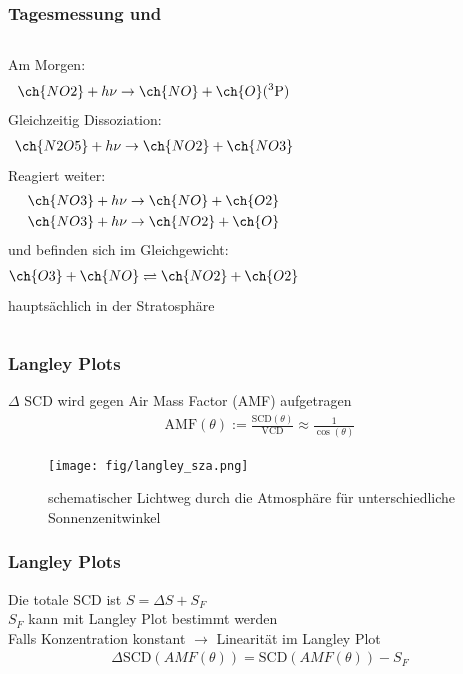 \documentclass{beamer}
\begin{document}
\begin{frame}
    \frametitle{Tagesmessung  und }
    \begin{columns}
    	Am Morgen:
    	\begin{align}
    		\ch{NO2} + h \nu \to \ch{NO} + \ch{O}(^3\text{P})
    	\end{align}
    \pause
    	Gleichzeitig Dissoziation:
    	\begin{align}
    		\ch{N2O5} + h \nu \to \ch{NO2} + \ch{NO3}
    	\end{align}
    \pause
    	Reagiert weiter:
    	\begin{align}
    		\ch{NO3} + h \nu \to \ch{NO} + \ch{O2}\\
    		\ch{NO3} + h \nu \to \ch{NO2} + \ch{O}
    	\end{align}
    \pause	
      	 und  befinden sich im Gleichgewicht:
      		\begin{align}
      			\ch{O3} + \ch{NO} \rightleftharpoons \ch{NO2} + \ch{O2}
      		\end{align}
      	 hauptsächlich in der Stratosphäre	
    \end{columns}
\end{frame}

\begin{frame}
    \frametitle{Langley Plots}
    $\Delta$ SCD wird gegen Air Mass Factor (AMF) aufgetragen\\
    \begin{align}
        \text{AMF}(\theta) := \frac{\text{SCD}(\theta)}{\text{VCD}} \approx \frac{1}{\cos (\theta)}
    \end{align}
    \begin{figure}
        \texttt{[image: fig/langley\_sza.png]}
        \caption{schematischer Lichtweg durch die Atmosphäre für unterschiedliche Sonnenzenitwinkel \cite{atm_script}}
    \end{figure}
\end{frame}

\begin{frame}
    \frametitle{Langley Plots}
    Die totale SCD ist $S = \Delta S + S_F$\\
    $S_F$ kann mit Langley Plot bestimmt werden\\
    Falls Konzentration konstant $\to$ Linearität im Langley Plot
    \begin{align}
    	\Delta \text{SCD}(AMF(\theta)) = \text{SCD}(AMF(\theta)) - S_F
    \end{align}
\end{frame}
\end{document}
